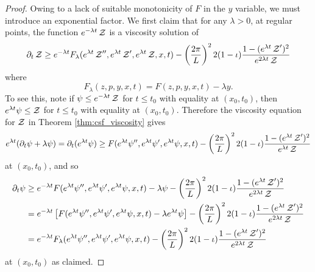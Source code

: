 \documentclass[11pt]{amsart}
\begin{document}
\begin{proof}
Owing to a lack of suitable monotonicity of $F$ in the $y$ variable, we must introduce an exponential factor. We first claim that for any $\lambda > 0$, at regular points, the function $e^{-\lambda t} \operatorname{\mathcal{Z}}$ is a viscosity solution of
\begin{equation}
\label{eq:exponential_viscosity}
\partial_t \operatorname{\mathcal{Z}} \geq e^{-\lambda t} F_{\lambda} (e^{\lambda t} \operatorname{\mathcal{Z}}'', e^{\lambda t} \operatorname{\mathcal{Z}}', e^{\lambda t} \operatorname{\mathcal{Z}}, x, t) - \left(\frac{2\pi}{L}\right)^2 2 (1-\operatorname{\iota}) \frac{1 - (e^{\lambda t} \operatorname{\mathcal{Z}}')^2}{e^{2\lambda t} \operatorname{\mathcal{Z}}}
\end{equation}
where
\[
F_{\lambda}(z, p, y, x, t) = F(z, p, y, x, t) - \lambda y.
\]
To see this, note if $\psi \leq e^{-\lambda t} \operatorname{\mathcal{Z}}$ for $t\leq t_0$ with equality at $(x_0, t_0)$, then $e^{\lambda t} \psi \leq \operatorname{\mathcal{Z}}$ for $t\leq t_0$ with equality at $(x_0, t_0)$. Therefore the viscosity equation for $\operatorname{\mathcal{Z}}$ in Theorem \ref{thm:csf_viscosity} gives
\[
e^{\lambda t} (\partial_t \psi + \lambda \psi) = \partial_t (e^{\lambda t} \psi) \geq F(e^{\lambda t} \psi'', e^{\lambda t} \psi', e^{\lambda t} \psi, x, t) - \left(\frac{2\pi}{L}\right)^2 2 (1-\operatorname{\iota}) \frac{1 - (e^{\lambda t} \operatorname{\mathcal{Z}}')^2}{e^{\lambda t} \operatorname{\mathcal{Z}}}
\]
at $(x_0, t_0)$, and so
\[
\begin{split}
\partial_t \psi &\geq e^{-\lambda t} F(e^{\lambda t} \psi'', e^{\lambda t} \psi', e^{\lambda t} \psi, x, t) - \lambda \psi - \left(\frac{2\pi}{L}\right)^2 2 (1-\operatorname{\iota}) \frac{1 - (e^{\lambda t} \operatorname{\mathcal{Z}}')^2}{e^{2\lambda t} \operatorname{\mathcal{Z}}} \\
&= e^{-\lambda t} \left[F(e^{\lambda t} \psi'', e^{\lambda t} \psi', e^{\lambda t} \psi, x, t) - \lambda e^{\lambda t} \psi\right] - \left(\frac{2\pi}{L}\right)^2 2 (1-\operatorname{\iota}) \frac{1 - (e^{\lambda t} \operatorname{\mathcal{Z}}')^2}{e^{2\lambda t} \operatorname{\mathcal{Z}}} \\
&= e^{-\lambda t} F_{\lambda}(e^{\lambda t} \psi'', e^{\lambda t} \psi', e^{\lambda t} \psi, x, t) - \left(\frac{2\pi}{L}\right)^2 2 (1-\operatorname{\iota}) \frac{1 - (e^{\lambda t} \operatorname{\mathcal{Z}}')^2}{e^{2\lambda t} \operatorname{\mathcal{Z}}}
\end{split}
\]
at $(x_0, t_0)$ as claimed.


\end{proof}
\end{document}
